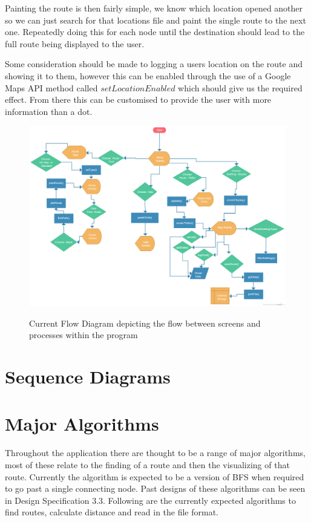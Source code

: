 Painting the route is then fairly simple, we know which location opened another so we can just search for that locations file and paint the single route to the next one. Repeatedly doing this for each node until the destination should lead to the full route being displayed to the user.

Some consideration should be made to logging a users location on  the route and showing it to them, however this can be enabled through the use of a Google Maps API method called $setLocationEnabled$ which should give us the required effect. From there this can be customised to provide the user with more information than a dot. 

\begin{figure}
\includegraphics[scale=0.22]{Chapter2/flowo.png} \\
\caption[Flow Diagram]{Current Flow Diagram depicting the flow between screens and processes within the program}
\end{figure}
\newpage
\section{Sequence Diagrams}
\section{Major Algorithms}
Throughout the application there are thought to be a range of major algorithms, most of these relate to the finding of a route and then the visualizing of that route. Currently the algorithm is expected to be a version of BFS when required to go past a single connecting node. Past designs of these algorithms can be seen in Design Specification 3.3. Following are the currently expected algorithms to find routes, calculate distance and read in the file format.

